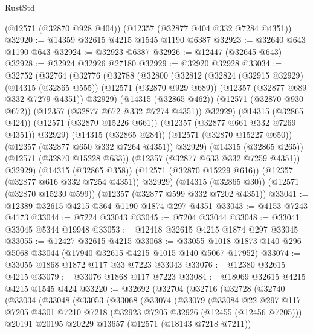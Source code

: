 \begin{lexlean}{RustStd}
\begin{coremodule}
    (@12571 (@32870 @928 @404))
    (@12357 (@32877 @404 @332 @7284 @4351))
@32920 := @14359 @32615 @4215 @1545 @1190 @6387
@32923 := @32640 @643 @1190 @643
@32924 := @32923 @6387
@32926 := @12447 (@32645 @643)
@32928 := @32924 @32926 @27180
@32929 := @32920 @32928
@33034 := @32752
    (@32764
      (@32776
        (@32788
          (@32800
            (@32812
              (@32824
                (@32915 @32929)
                (@14315 (@32865 @555))
                (@12571 (@32870 @929 @689))
                (@12357 (@32877 @689 @332 @7279 @4351))
                @32929)
              (@14315 (@32865 @462))
              (@12571 (@32870 @930 @672))
              (@12357 (@32877 @672 @332 @7274 @4351))
              @32929)
            (@14315 (@32865 @424))
            (@12571 (@32870 @15226 @661))
            (@12357 (@32877 @661 @332 @7269 @4351))
            @32929)
          (@14315 (@32865 @284))
          (@12571 (@32870 @15227 @650))
          (@12357 (@32877 @650 @332 @7264 @4351))
          @32929)
        (@14315 (@32865 @265))
        (@12571 (@32870 @15228 @633))
        (@12357 (@32877 @633 @332 @7259 @4351))
        @32929)
      (@14315 (@32865 @358))
      (@12571 (@32870 @15229 @616))
      (@12357 (@32877 @616 @332 @7254 @4351))
      @32929)
    (@14315 (@32865 @30))
    (@12571 (@32870 @15230 @599))
    (@12357 (@32877 @599 @332 @7202 @4351))
@33041 := @12389 @32615 @4215 @364 @1190 @1874 @297 @4351
@33043 := @4153 @7243 @4173
@33044 := @7224 @33043
@33045 := @7204 @33044
@33048 := @33041 @33045 @5344 @19948
@33053 := @12418 @32615 @4215 @1874 @297 @33045
@33055 := @12427 @32615 @4215
@33068 := @33055 @1018 @1873 @140 @296 @5068 @33044 (@17940 @32615 @4215 @1015 @140 @5067 @17952)
@33074 := @33055 @1868 @1872 @117 @33 @7223 @33043
@33076 := @12380 @32615 @4215
@33079 := @33076 @1868 @117 @7223
@33084 := @18069 @32615 @4215 @4215 @1545 @424
@33220 := @32692
    (@32704
      (@32716
        (@32728
          (@32740
            (@33034
              (@33048
                (@33053
                  (@33068
                    (@33074
                      (@33079
                        (@33084
                          @22
                          @297
                          @117
                          @7205
                          @4301
                          @7210
                          @7218
                          (@32923 @7205 @32926 (@12455 (@12456 @7205)))
                          @20191
                          @20195
                          @20229
                          @13657
                          (@12571 (@18143 @7218 @7211))

\end{coremodule}
\end{lexlean}
